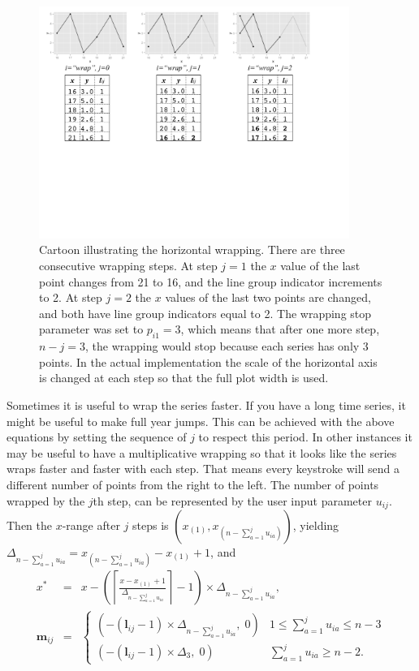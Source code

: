 \documentclass[12pt]{article}
\begin{document}
\begin{itemize}
\begin{center}
\begin{figure}[H]
\centerline{\includegraphics[width=0.9\textwidth]{graph/wrap-example.pdf}}
\caption{\label{fig:x-wrapping-algorithm} Cartoon illustrating
the horizontal wrapping. There are three consecutive wrapping
steps. At step $j=1$ the $x$ value of the last point changes
from 21 to 16, and the line group indicator increments to 2.
At step $j=2$ the $x$ values of the last two points are changed,
and both have line group indicators equal to 2.  The wrapping
stop parameter was set to $p_{i1}=3$, which means that after
one more step, $n-j=3$, the wrapping would stop because each
series has only 3 points. In the actual implementation the
scale of the horizontal axis is changed at each step so that
the full plot width is used.}
\end{figure}
\par\end{center}

Sometimes it is useful to wrap the series faster. If you have
a long time series, it might be useful to make full year jumps.
This can be achieved with the above equations by setting the
sequence of $j$ to respect this period. In other instances it
may be useful to have a multiplicative wrapping so that it
looks like the series wraps faster and faster with each step.
That means every keystroke will send a different number of
points from the right to the left. The number of points
wrapped by the $j$th step, can be represented by the user
input parameter $u_{ij}$. Then the $x$-range after $j$ steps
is $(x_{(1)}, x_{(n-\sum_{a=1}^j u_{ia})})$, yielding
$\Delta_{n-\sum_{a=1}^j u_{ia}}=x_{(n-\sum_{a=1}^j u_{ia})}-x_{(1)}+1$, and
\begin{eqnarray*}
x^* & = & x-\left(\left\lceil \frac{x-x_{(1)}+1}{\Delta_{n-\sum_{a=1}^j u_{ia}}}\right\rceil -1\right)\times\Delta_{n-\sum_{a=1}^j u_{ia}}, \\
\mathbf{m}{}_{ij} & = & \begin{cases}
(-(\mathbf{l}{}_{ij} -1)\times\Delta_{n-\sum_{a=1}^j u_{ia}}, \; 0) & 1\leq \sum_{a=1}^j u_{ia} \leq n-3 \\
(-(\mathbf{l}{}_{ij} -1)\times\Delta_3, \; 0) & \sum_{a=1}^j u_{ia}\ge n-2.
\end{cases}
\end{eqnarray*}


\end{itemize}
\end{document}
